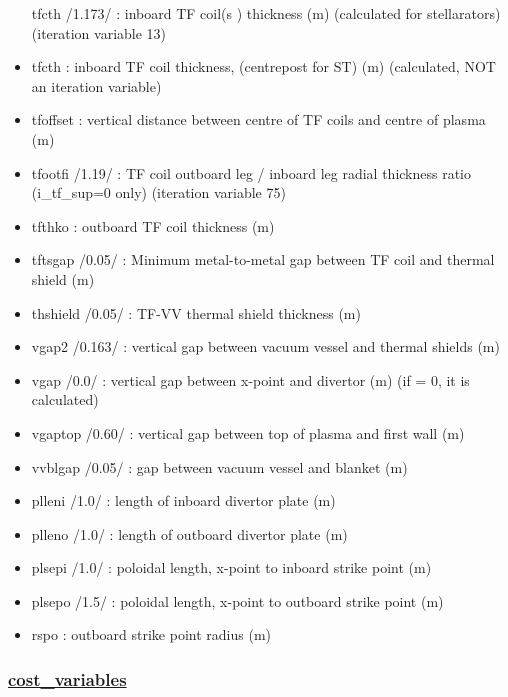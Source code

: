 \documentclass[]{article}
\begin{document}
\begin{itemize}
  tfcth /1.173/ : inboard TF coil(s ) thickness (m) (calculated for
  stellarators) (iteration variable 13)
\item
  tfcth : inboard TF coil thickness, (centrepost for ST) (m)
  (calculated, NOT an iteration variable)
\item
  tfoffset : vertical distance between centre of TF coils and centre of
  plasma (m)
\item
  tfootfi /1.19/ : TF coil outboard leg / inboard leg radial thickness
  ratio (i_tf_sup=0 only) (iteration variable 75)
\item
  tfthko : outboard TF coil thickness (m)
\item
  tftsgap /0.05/ : Minimum metal-to-metal gap between TF coil and
  thermal shield (m)
\item
  thshield /0.05/ : TF-VV thermal shield thickness (m)
\item
  vgap2 /0.163/ : vertical gap between vacuum vessel and thermal shields
  (m)
\item
  vgap /0.0/ : vertical gap between x-point and divertor (m) (if = 0, it
  is calculated)
\item
  vgaptop /0.60/ : vertical gap between top of plasma and first wall (m)
\item
  vvblgap /0.05/ : gap between vacuum vessel and blanket (m)
\item
  plleni /1.0/ : length of inboard divertor plate (m)
\item
  plleno /1.0/ : length of outboard divertor plate (m)
\item
  plsepi /1.0/ : poloidal length, x-point to inboard strike point (m)
\item
  plsepo /1.5/ : poloidal length, x-point to outboard strike point (m)
\item
  rspo : outboard strike point radius (m)
\end{itemize}

\subsubsection{\texorpdfstring{\href{cost_variables.html}{cost\_variables}}{cost\_variables}}\label{cost_variables}
\end{document}
